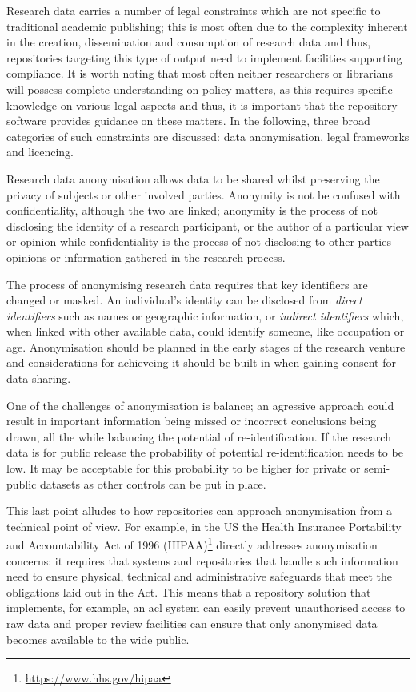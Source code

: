Research data carries a number of legal constraints which are not specific to traditional academic publishing; this is most often due to the complexity inherent in the creation, dissemination and consumption of research data and thus, repositories targeting this type of output need to implement facilities supporting compliance. It is worth noting that most often neither researchers or librarians will possess complete understanding on policy matters, as this requires specific knowledge on various legal aspects and thus, it is important that the repository software provides guidance on these matters. In the following, three broad categories of such constraints are discussed: data anonymisation, legal frameworks and licencing.

Research data anonymisation allows data to be shared whilst preserving the privacy of subjects or other involved parties. Anonymity is not be confused with confidentiality, although the two are linked; anonymity is the process of not disclosing the identity of a research participant, or the author of a particular view or opinion while confidentiality is the process of
not disclosing to other parties opinions or information gathered in the research process\cite{anonrdata}.

The process of anonymising research data requires that key identifiers are changed or masked. An individual's identity can be disclosed from \emph{direct identifiers} such as names or geographic information, or \emph{indirect identifiers} which, when linked with other available data, could identify someone, like occupation or age. Anonymisation should be planned in the early stages of the research venture and considerations for achieveing it should be built in when gaining consent for data sharing. 

One of the challenges of anonymisation is balance; an agressive approach could result in important information being missed or incorrect conclusions being drawn, all the while balancing the potential of re-identification. If the research data is for public release the probability of potential re-identification needs to be low. It may be acceptable for this probability to be higher for private or semi-public datasets as other controls can be put in place\cite{bmjanon}.

This last point alludes to how repositories can approach anonymisation from a technical point of view. For example, in the US the Health Insurance Portability and Accountability Act of 1996 (HIPAA)\footnote{\url{https://www.hhs.gov/hipaa}} directly addresses anonymisation concerns: it requires that systems and repositories that handle such information need to ensure physical, technical and administrative safeguards that meet the obligations laid out in the Act. This means that a repository solution that implements, for example, an \gls{acl} system can easily prevent unauthorised access to raw data and proper review facilities can ensure that only anonymised data becomes available to the wide public.

